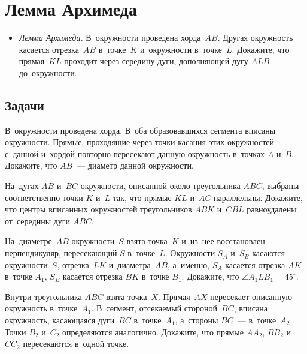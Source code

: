 
\section*{Лемма Архимеда}


\begin{itemize}

\item\emph{Лемма Архимеда.}
В~окружности проведена хорда~$AB$.
Другая окружность касается отрезка~$AB$ в~точке~$K$ и~окружности в~точке~$L$.
Докажите, что прямая~$KL$ проходит через середину дуги, дополняющей дугу $ALB$
до~окружности.

\end{itemize}

\subsection*{Задачи}

\begin{problems}

\item
В~окружности проведена хорда.
В~оба образовавшихся сегмента вписаны окружности.
Прямые, проходящие через точки касания этих окружностей с~данной и~хордой
повторно пересекают данную окружность в~точках $A$ и~$B$.
Докажите, что $AB$~--- диаметр данной окружности.

\item
На~дугах $AB$ и~$BC$ окружности, описанной около треугольника $ABC$, выбраны
соответственно точки $K$ и~$L$ так, что прямые $KL$ и~$AC$ параллельны.
Докажите, что центры вписанных окружностей треугольников $ABK$ и~$CBL$
равноудалены от~середины дуги $ABC$.

\item
На~диаметре~$AB$ окружности~$S$ взята точка~$K$ и~из~нее восстановлен
перпендикуляр, пересекающий $S$ в~точке~$L$.
Окружности $S_A$ и~$S_B$ касаются окружности~$S$, отрезка~$LK$ и~диаметра~$AB$,
а~именно, $S_A$ касается отрезка $AK$ в~точке $A_1$, $S_B$ касается отрезка
$BK$ в~точке $B_1$.
Докажите, что $\angle A_1 L B_1 = 45^{\circ}$.

\item
Внутри треугольника $ABC$ взята точка~$X$.
Прямая~$AX$ пересекает описанную окружность в~точке~$A_1$.
В~сегмент, отсекаемый стороной~$BC$, вписана окружность, касающаяся дуги~$BC$
в~точке~$A_1$, а~стороны $BC$~--- в~точке~$A_2$.
Точки $B_2$ и~$C_2$ определяются аналогично.
Докажите, что прямые $A A_2$, $B B_2$ и~$C C_2$ пересекаются в~одной точке.

\end{problems}

